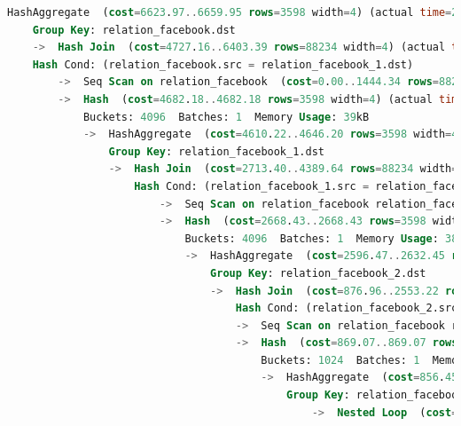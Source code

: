 \begin{lstlisting}[language=SQL,caption = Ausführungsplan verschachteltes SELECT,frame=single, label={AusführungsplanCascadeSELECT} ]
    HashAggregate  (cost=6623.97..6659.95 rows=3598 width=4) (actual time=27.019..27.049 rows=317 loops=1)
    Group Key: relation_facebook.dst
    ->  Hash Join  (cost=4727.16..6403.39 rows=88234 width=4) (actual time=20.593..26.743 rows=2411 loops=1)
    Hash Cond: (relation_facebook.src = relation_facebook_1.dst)
        ->  Seq Scan on relation_facebook  (cost=0.00..1444.34 rows=88234 width=8) (actual time=0.008..3.889 rows=88234 loops=1)
        ->  Hash  (cost=4682.18..4682.18 rows=3598 width=4) (actual time=18.021..18.021 rows=195 loops=1)
            Buckets: 4096  Batches: 1  Memory Usage: 39kB
            ->  HashAggregate  (cost=4610.22..4646.20 rows=3598 width=4) (actual time=17.976..18.000 rows=195 loops=1)
                Group Key: relation_facebook_1.dst
                ->  Hash Join  (cost=2713.40..4389.64 rows=88234 width=4) (actual time=11.821..17.797 rows=1709 loops=1)
                    Hash Cond: (relation_facebook_1.src = relation_facebook_2.dst)
                        ->  Seq Scan on relation_facebook relation_facebook_1  (cost=0.00..1444.34 rows=88234 width=8) (actual time=0.002..3.916 rows=88234 loops=1)
                        ->  Hash  (cost=2668.43..2668.43 rows=3598 width=4) (actual time=9.177..9.177 rows=144 loops=1)
                            Buckets: 4096  Batches: 1  Memory Usage: 38kB
                            ->  HashAggregate  (cost=2596.47..2632.45 rows=3598 width=4) (actual time=9.140..9.161 rows=144 loops=1)
                                Group Key: relation_facebook_2.dst
                                ->  Hash Join  (cost=876.96..2553.22 rows=17301 width=4) (actual time=2.942..9.020 rows=1280 loops=1)
                                    Hash Cond: (relation_facebook_2.src = relation_facebook_3.dst)
                                    ->  Seq Scan on relation_facebook relation_facebook_2  (cost=0.00..1444.34 rows=88234 width=8) (actual time=0.002..4.163 rows=88234 loops=1)
                                    ->  Hash  (cost=869.07..869.07 rows=631 width=4) (actual time=0.276..0.276 rows=88 loops=1)
                                        Buckets: 1024  Batches: 1  Memory Usage: 12kB
                                        ->  HashAggregate  (cost=856.45..862.76 rows=631 width=4) (actual time=0.259..0.268 rows=88 loops=1)
                                            Group Key: relation_facebook_3.dst
                                                ->  Nested Loop  (cost=44.35..854.88 rows=631 width=4) (actual time=0.022..0.199 rows=629 loops=1)

\end{lstlisting}
